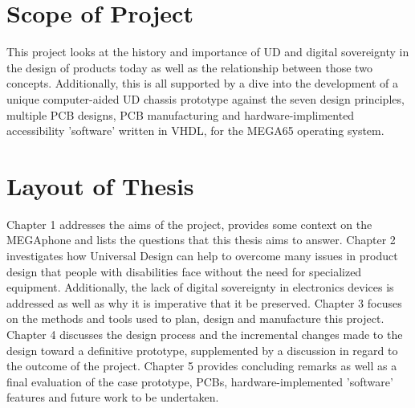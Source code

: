 
\section{Scope of Project}

This project looks at the history and importance of UD and digital sovereignty in the design of products today as well as the relationship between those two concepts. 
Additionally, this is all supported by a dive into the development of a unique computer-aided UD chassis prototype against the seven design principles\cite{sevenprinciples}, multiple PCB designs, PCB manufacturing and hardware-implimented accessibility 'software' written in VHDL, for the MEGA65 operating system.


\section{Layout of Thesis}

Chapter 1 addresses the aims of the project, provides some context on the MEGAphone and lists the questions that this thesis aims to answer.
Chapter 2 investigates how Universal Design can help to overcome many issues in product design that people with disabilities face without the need for specialized equipment. 
Additionally, the lack of digital sovereignty in electronics devices is addressed as well as why it is imperative that it be preserved.
Chapter 3 focuses on the methods and tools used to plan, design and manufacture this project.
Chapter 4 discusses the design process and the incremental changes made to the design toward a definitive prototype, supplemented by a discussion in regard to the outcome of the project. 
Chapter 5 provides concluding remarks as well as a final evaluation of the case prototype, PCBs, hardware-implemented 'software' features and future work to be undertaken.


